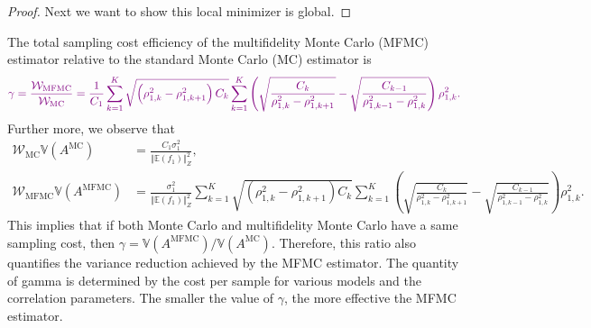 \documentclass[final,3p,times,11pt]{elsarticle}
\newcommand{\JLcolor}[1]{{\textcolor{violet}{#1}}} %
\begin{document}
\begin{proof}
Next we want to show this local minimizer is global.



\end{proof}

The total sampling cost efficiency of the multifidelity Monte Carlo (MFMC) estimator relative to the standard Monte Carlo (MC) estimator is
\[
\JLcolor{\gamma = \frac{\mathcal{W}_\text{MFMC}}{\mathcal{W}_\text{MC}} = \frac{1}{C_1} \sum_{k=1}^K\sqrt{\left(\rho_{1,k}^2 - \rho_{1,k+1}^2\right)C_k}\sum_{k=1}^K\left(\sqrt{\frac{C_k}{\rho_{1,k}^2 - \rho_{1,k+1}^2}} - \sqrt{\frac{C_{k-1}}{\rho_{1,{k-1}}^2 - \rho_{1,k}^2}}\right)\rho_{1,k}^2.}
\]
Further more, we observe that
\begin{align*}
    \mathcal{W}_\text{MC}\mathbb{V}\left(A^{\text{MC}}\right) &=\frac{C_1\sigma_1^2}{\left\Vert\mathbb{E}(f_1) \right\Vert_{Z}^2},\\
 \mathcal{W}_\text{MFMC}\mathbb{V}\left(A^{\text{MFMC}}\right) &=  \frac{\sigma_1^2}{\left\Vert\mathbb{E}(f_1) \right\Vert_{Z}^2}\sum_{k=1}^K\sqrt{\left(\rho_{1,k}^2 - \rho_{1,k+1}^2\right)C_k}\sum_{k=1}^K\left(\sqrt{\frac{C_k}{\rho_{1,k}^2 - \rho_{1,k+1}^2}} - \sqrt{\frac{C_{k-1}}{\rho_{1,{k-1}}^2 - \rho_{1,k}^2}}\right)\rho_{1,k}^2.
\end{align*}
This implies that if both Monte Carlo and multifidelity Monte Carlo have  a same sampling cost, then $\gamma=  \mathbb{V}\left(A^{\text{MFMC}}\right)/\mathbb{V}\left(A^{\text{MC}}\right)$. Therefore, this ratio also quantifies the variance reduction achieved by the MFMC estimator. The quantity of gamma is determined by the cost per sample for various models and the correlation parameters. The smaller the value of $\gamma$, the more effective the MFMC estimator.
\end{document}
